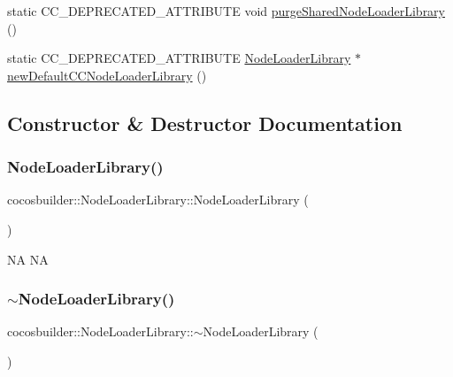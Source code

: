 \begin{DoxyCompactItemize}
\item 
static C\+C\+\_\+\+D\+E\+P\+R\+E\+C\+A\+T\+E\+D\+\_\+\+A\+T\+T\+R\+I\+B\+U\+TE void \hyperlink{classcocosbuilder_1_1NodeLoaderLibrary_a073ae9ba071000f0c2b93ea1b049474e}{purge\+Shared\+Node\+Loader\+Library} ()
\item 
static C\+C\+\_\+\+D\+E\+P\+R\+E\+C\+A\+T\+E\+D\+\_\+\+A\+T\+T\+R\+I\+B\+U\+TE \hyperlink{classcocosbuilder_1_1NodeLoaderLibrary}{Node\+Loader\+Library} $\ast$ \hyperlink{classcocosbuilder_1_1NodeLoaderLibrary_a565251dc670e03fced0d284b2190a7bc}{new\+Default\+C\+C\+Node\+Loader\+Library} ()
\end{DoxyCompactItemize}


\subsection{Constructor \& Destructor Documentation}
\mbox{\label{classcocosbuilder_1_1NodeLoaderLibrary_a18731618610d1221e83013b352c271a9}} 
\subsubsection{\texorpdfstring{Node\+Loader\+Library()}{NodeLoaderLibrary()}\hspace{0.1cm}{\footnotesize\ttfamily [1/2]}}
{\footnotesize\ttfamily cocosbuilder\+::\+Node\+Loader\+Library\+::\+Node\+Loader\+Library (\begin{DoxyParamCaption}{ }\end{DoxyParamCaption})}

NA  NA \mbox{\label{classcocosbuilder_1_1NodeLoaderLibrary_a0daf8f4fa7a9d25e42588c4abea45cc7}} 
\subsubsection{\texorpdfstring{$\sim$\+Node\+Loader\+Library()}{~NodeLoaderLibrary()}\hspace{0.1cm}{\footnotesize\ttfamily [1/2]}}
{\footnotesize\ttfamily cocosbuilder\+::\+Node\+Loader\+Library\+::$\sim$\+Node\+Loader\+Library (\begin{DoxyParamCaption}{ }\end{DoxyParamCaption})\hspace{0.3cm}{\ttfamily [virtual]}}

